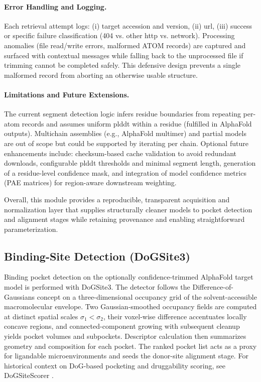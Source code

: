 \paragraph{Error Handling and Logging.} Each retrieval attempt logs: (i) target accession and version, (ii) \gls{url}, (iii) success or specific failure classification (404 vs. other \gls{http} vs. network). Processing anomalies (file read/write errors, malformed ATOM records) are captured and surfaced with contextual messages while falling back to the unprocessed file if trimming cannot be completed safely. This defensive design prevents a single malformed record from aborting an otherwise usable structure.

\paragraph{Limitations and Future Extensions.} The current segment detection logic infers residue boundaries from repeating per-atom records and assumes uniform \gls{plddt} within a residue (fulfilled in AlphaFold outputs). Multichain assemblies (e.g., AlphaFold multimer) and partial models are out of scope but could be supported by iterating per chain. Optional future enhancements include: checksum-based cache validation to avoid redundant downloads, configurable \gls{plddt} thresholds and minimal segment length, generation of a residue-level confidence mask, and integration of model confidence metrics (PAE matrices) for region-aware downstream weighting.

Overall, this module provides a reproducible, transparent acquisition and normalization layer that supplies structurally cleaner models to pocket detection and alignment stages while retaining provenance and enabling straightforward parameterization.

\subsection{Binding-Site Detection (DoGSite3)}\label{subsec:dogsite}
Binding pocket detection on the optionally confidence-trimmed AlphaFold target model is performed with DoGSite3. The detector follows the Difference-of-Gaussians concept on a three-dimensional occupancy grid of the solvent-accessible macromolecular envelope. Two Gaussian-smoothed occupancy fields are computed at distinct spatial scales $\sigma_1 < \sigma_2$, their voxel-wise difference accentuates locally concave regions, and connected-component growing with subsequent cleanup yields pocket volumes and subpockets. Descriptor calculation then summarizes geometry and composition for each pocket. The ranked pocket list acts as a proxy for ligandable microenvironments and seeds the donor-site alignment stage. For historical context on DoG-based pocketing and druggability scoring, see DoGSiteScorer \cite{volkamerDoGSiteScorerWebServer2012}.

